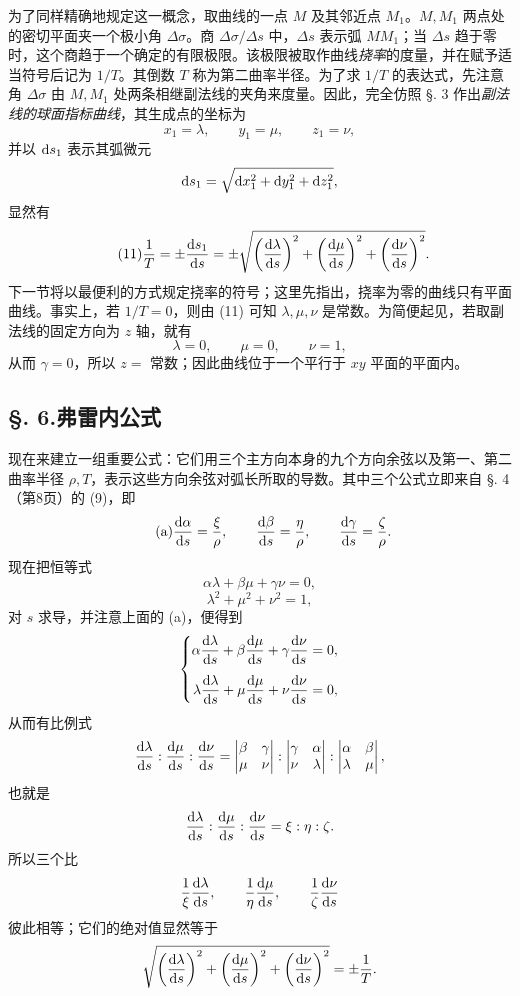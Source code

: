 为了同样精确地规定这一概念，取曲线的一点 \(M\) 及其邻近点 \(M_1\)。\(M,M_1\) 两点处的密切平面夹一个极小角 \(\Delta\sigma\)。商 \(\Delta\sigma/\Delta s\) 中，\(\Delta s\) 表示弧 \(MM_1\)；当 \(\Delta s\) 趋于零时，这个商趋于一个确定的有限极限。该极限被取作曲线\emph{挠率}的度量，并在赋予适当符号后记为 \(1/T\)。其倒数 \(T\) 称为第二曲率半径。为了求 \(1/T\) 的表达式，先注意角 \(\Delta\sigma\) 由 \(M,M_1\) 处两条相继副法线的夹角来度量。因此，完全仿照 §. 3 作出\emph{副法线的球面指标曲线}，其生成点的坐标为
\[
 x_1=\lambda,\qquad y_1=\mu,\qquad z_1=\nu,
\]
并以 \(\mathrm{d} s_1\) 表示其弧微元
\[
\mathrm{d} s_1=\sqrt{\mathrm{d} x_1^2+\mathrm{d} y_1^2+\mathrm{d} z_1^2},
\]
显然有
\begin{equation}\tag{11}
\frac{1}{T}=\pm\frac{\mathrm{d} s_1}{\mathrm{d} s}=\pm\sqrt{\left(\frac{\mathrm{d}\lambda}{\mathrm{d} s}\right)^2+\left(\frac{\mathrm{d}\mu}{\mathrm{d} s}\right)^2+\left(\frac{\mathrm{d}\nu}{\mathrm{d} s}\right)^2}.
\end{equation}
下一节将以最便利的方式规定挠率的符号；这里先指出，挠率为零的曲线只有平面曲线。事实上，若 \(1/T=0\)，则由 (11) 可知 \(\lambda,\mu,\nu\) 是常数。为简便起见，若取副法线的固定方向为 \(z\) 轴，就有
\[
\lambda=0,
\qquad \mu=0,
\qquad \nu=1,
\]
从而 \(\gamma=0\)，所以 \(z=\) 常数；因此曲线位于一个平行于 \(xy\) 平面的平面内。

\subsection*{§. 6.\quad 弗雷内公式}
现在来建立一组重要公式：它们用三个主方向本身的九个方向余弦以及第一、第二曲率半径 \(\rho,T\)，表示这些方向余弦对弧长所取的导数。其中三个公式立即来自 §. 4（第8页）的 (9)，即
\begin{equation}\tag{a}
\frac{\mathrm{d}\alpha}{\mathrm{d} s}=\frac{\xi}{\rho},\qquad
\frac{\mathrm{d}\beta}{\mathrm{d} s}=\frac{\eta}{\rho},\qquad
\frac{\mathrm{d}\gamma}{\mathrm{d} s}=\frac{\zeta}{\rho}.
\end{equation}
现在把恒等式
\[
\alpha\lambda+\beta\mu+\gamma\nu=0,
\]
\[
\lambda^2+\mu^2+\nu^2=1,
\]
对 \(s\) 求导，并注意上面的 (a)，便得到
\[
\left\{
\begin{aligned}
\alpha\frac{\mathrm{d}\lambda}{\mathrm{d} s}+\beta\frac{\mathrm{d}\mu}{\mathrm{d} s}+\gamma\frac{\mathrm{d}\nu}{\mathrm{d} s}&=0,\\[0.4em]
\lambda\frac{\mathrm{d}\lambda}{\mathrm{d} s}+\mu\frac{\mathrm{d}\mu}{\mathrm{d} s}+\nu\frac{\mathrm{d}\nu}{\mathrm{d} s}&=0,
\end{aligned}\right.
\]
从而有比例式
\[
\frac{\mathrm{d}\lambda}{\mathrm{d} s}:\frac{\mathrm{d}\mu}{\mathrm{d} s}:\frac{\mathrm{d}\nu}{\mathrm{d} s}=
\left|\begin{matrix}\beta&\gamma\\ \mu&\nu\end{matrix}\right|:
\left|\begin{matrix}\gamma&\alpha\\ \nu&\lambda\end{matrix}\right|:
\left|\begin{matrix}\alpha&\beta\\ \lambda&\mu\end{matrix}\right|,
\]
也就是
\[
\frac{\mathrm{d}\lambda}{\mathrm{d} s}:\frac{\mathrm{d}\mu}{\mathrm{d} s}:\frac{\mathrm{d}\nu}{\mathrm{d} s}=\xi:\eta:\zeta.
\]
所以三个比
\[
\frac{1}{\xi}\frac{\mathrm{d}\lambda}{\mathrm{d} s},\qquad
\frac{1}{\eta}\frac{\mathrm{d}\mu}{\mathrm{d} s},\qquad
\frac{1}{\zeta}\frac{\mathrm{d}\nu}{\mathrm{d} s}
\]
彼此相等；它们的绝对值显然等于
\[
\sqrt{\left(\frac{\mathrm{d}\lambda}{\mathrm{d} s}\right)^2+\left(\frac{\mathrm{d}\mu}{\mathrm{d} s}\right)^2+\left(\frac{\mathrm{d}\nu}{\mathrm{d} s}\right)^2}=\pm\frac{1}{T}.
\]


